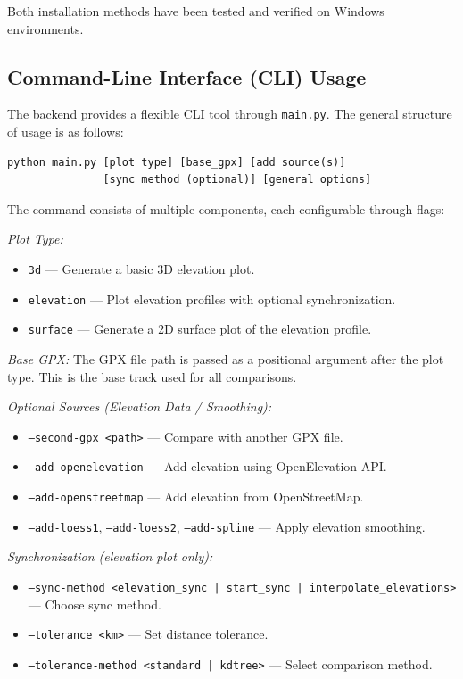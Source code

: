 \documentclass[12pt]{article}
\begin{document}
Both installation methods have been tested and verified on Windows environments.

\subsection*{Command-Line Interface (CLI) Usage}

The backend provides a flexible CLI tool through \texttt{main.py}. The general structure of usage is as follows:

\begin{lstlisting}
python main.py [plot type] [base_gpx] [add source(s)] 
               [sync method (optional)] [general options]
\end{lstlisting}

The command consists of multiple components, each configurable through flags:

\textit{Plot Type:}
\begin{itemize}
  \item \texttt{3d} — Generate a basic 3D elevation plot.
  \item \texttt{elevation} — Plot elevation profiles with optional synchronization.
  \item \texttt{surface} — Generate a 2D surface plot of the elevation profile.
\end{itemize}

\textit{Base GPX:}  
The GPX file path is passed as a positional argument after the plot type. This is the base track used for all comparisons.

\textit{Optional Sources (Elevation Data / Smoothing):}
\begin{itemize}
  \item \texttt{--second-gpx <path>} — Compare with another GPX file.
  \item \texttt{--add-openelevation} — Add elevation using OpenElevation API.
  \item \texttt{--add-openstreetmap} — Add elevation from OpenStreetMap.
  \item \texttt{--add-loess1}, \texttt{--add-loess2}, \texttt{--add-spline} — Apply elevation smoothing.
\end{itemize}

\textit{Synchronization (elevation plot only):}
\begin{itemize}
  \item \texttt{--sync-method <elevation\_sync | start\_sync | interpolate\_elevations>} — Choose sync method.
  \item \texttt{--tolerance <km>} — Set distance tolerance.
  \item \texttt{--tolerance-method <standard | kdtree>} — Select comparison method.

\end{itemize}
\end{document}
